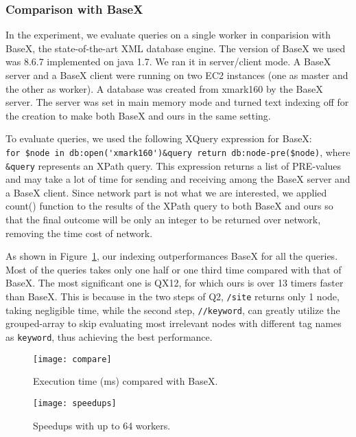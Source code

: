 \subsubsection{Comparison with BaseX}

In the experiment, we evaluate queries on a single worker in conparision with
BaseX, the state-of-the-art XML database engine. The version of BaseX we used
was 8.6.7 implemented on java 1.7. We ran it in server/client mode. A BaseX
server and a BaseX client were running on two EC2 instances (one as master and
the other as worker). A database was created from xmark160 by the BaseX server.
The server was set in main memory mode and turned text indexing off for the
creation to make both BaseX and ours in the same setting.

To evaluate queries, we used the following XQuery expression for BaseX:  \\
\verb|for $node in db:open('xmark160')&query return db:node-pre($node)|, where \\
\verb|&query| represents an XPath query. This expression returns a list of
PRE-values and may take a lot of time for sending and receiving among the BaseX
server and a BaseX client. Since network part is not what we are interested, we
applied count() function to the results of the XPath query to both BaseX and
ours so that the final outcome will be only an integer to be returned over
network, removing the time cost of network.

As shown in Figure~\ref{fig:compare}, our indexing outperformances BaseX for all
the queries. Most of the queries takes only one half or one third time compared
with that of BaseX. The most significant one is QX12, for which ours is over 13
timers faster than BaseX. This is because in the two steps of Q2, \texttt{/site}
returns only 1 node, taking negligible time, while the second step,
\texttt{//keyword}, can greatly utilize the grouped-array to skip evaluating
most irrelevant nodes with different tag names as \texttt{keyword}, thus
achieving the best performance.


\begin{figure}[thb]
	\centering
	\texttt{[image: compare]}
	\caption{Execution time (ms) compared with BaseX.}
	\label{fig:compare}       %
\end{figure}

\begin{figure}[thb]
	\centering
	\texttt{[image: speedups]}
	\caption{Speedups with up to 64 workers.}
	\label{fig:speedups}    
\end{figure}



